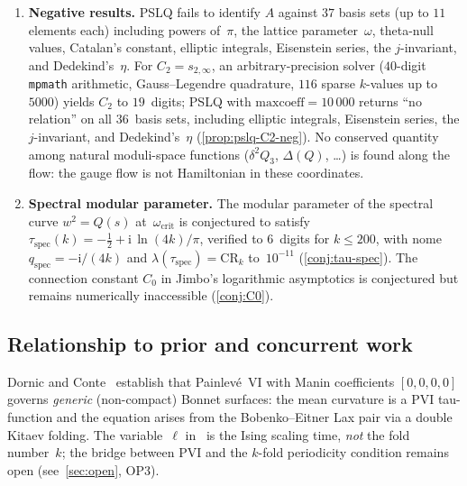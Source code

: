 \documentclass[11pt,a4paper]{article}
\theoremstyle{plain}
\theoremstyle{definition}
\theoremstyle{remark}
\newcommand{\vt}[1]{\vartheta_{#1}}     %
\newcommand{\ii}{\mathrm{i}}
\begin{document}
\begin{enumerate}[label=\textbf{C\arabic*}.,nosep]
  The quartic $Q(s)$ preserves the root type
  ($2$ real $+ 2$ complex conjugate) along the entire flow.
  At the critical point $\omega_{\mathrm{crit}}$ of
  $\vt{2}(\cdot|\tau)$, the full complex cross-ratio of the
  four roots is numerically constant (to $< 10^{-11}$), with $\lvert\arg(\mathrm{CR})
  \rvert \cdot k \to 4$~rad as $k \to \infty$
  (\cref{rem:CR-sign} discusses the sign convention).
  This constancy is a sharp property of $\omega_{\mathrm{crit}}$
  (not a consequence of $\tau$ being fixed), demonstrated by a
  systematic $\omega$-scan (\cref{sec:spectral-inv}).
\item \textbf{Negative results.}
  PSLQ fails to identify $A$ against $37$ basis sets
  (up to $11$ elements each) including
  powers of~$\pi$, the lattice parameter~$\omega$, theta-null
  values, Catalan's constant, elliptic integrals, Eisenstein
  series, the $j$-invariant, and Dedekind's~$\eta$.
  For $C_2 = s_{2,\infty}$, an arbitrary-precision solver
  ($40$-digit \texttt{mpmath} arithmetic, Gauss--Legendre
  quadrature, $116$ sparse $k$-values up to~$5000$)
  yields $C_2$ to $19$~digits; PSLQ with
  $\mathrm{maxcoeff} = 10\,000$ returns ``no relation'' on
  all $36$~basis sets, including elliptic integrals, Eisenstein
  series, the $j$-invariant, and Dedekind's~$\eta$
  (\cref{prop:pslq-C2-neg}).
  No conserved quantity among natural moduli-space functions
  ($\delta^2 Q_3$, $\Delta(Q)$, \ldots) is found along the flow:
  the gauge flow is not Hamiltonian in these coordinates.
\item \textbf{Spectral modular parameter.}
  The modular parameter of the spectral curve
  $w^2 = Q(s)$ at~$\omega_{\mathrm{crit}}$ is conjectured to satisfy
  $\tau_{\mathrm{spec}}(k) = -\tfrac12 + \ii\,\ln(4k)/\pi$,
  verified to $6$~digits for $k \le 200$, with
  nome $q_{\mathrm{spec}} = -\ii/(4k)$ and
  $\lambda(\tau_{\mathrm{spec}}) = \mathrm{CR}_k$
  to~$10^{-11}$ (\cref{conj:tau-spec}).
  The connection constant $C_0$ in Jimbo's logarithmic
  asymptotics is conjectured but remains numerically
  inaccessible (\cref{conj:C0}).
\end{enumerate}

\subsection{Relationship to prior and concurrent work}
Dornic and Conte~\cite{DC26} establish that Painlev\'e~VI
with Manin coefficients $[0,0,0,0]$ governs \emph{generic}
(non-compact) Bonnet surfaces: the mean curvature is a PVI
tau-function and the equation arises from the Bobenko--Eitner
Lax pair via a double Kitaev folding.
The variable~$\ell$ in~\cite{DC26} is the Ising scaling time,
\emph{not} the fold number~$k$; the bridge between PVI and
the $k$-fold periodicity condition remains open
(see~\cref{sec:open}, OP3).
\end{document}
